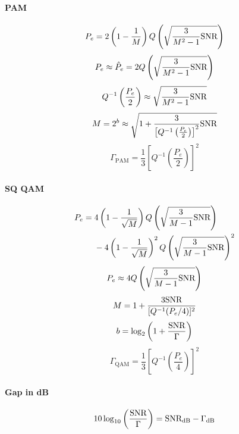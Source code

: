 \paragraph{PAM}
$$P_e = 2 \left(1 - \frac 1 M\right) Q \left( \sqrt{\frac{3}{M^2-1} {\textrm{SNR}}}  \right)$$
\begin{equation}
{P}_e \approx \hat P_e = 2 Q \left( \sqrt{\frac{3}{M^2-1}{\textrm{SNR}}}  \right)
\label{eq:pe_pam_gap}
\end{equation}
$$Q^{-1} \left( \frac {{P}_e}  2 \right) \approx \sqrt{\frac{3}{M^2-1}{\textrm{SNR}}} $$
$$M = 2^{{b}} \approx \sqrt{ 1 + \frac {3} {\left[ Q^{-1} \left( \frac {{P}_e}  2 \right) \right]^2} {\textrm{SNR}}}$$
\begin{equation}
\Gamma_{\textrm{PAM}} = \frac 1 3 \left[ Q^{-1} \left( \frac {{P}_e}  2 \right) \right]^2
\label{eq:gap_pam}
\end{equation}

\paragraph{SQ QAM}
\begin{equation}
\begin{split}
P_e = {} & 4 \left( 1 - \frac 1 {\sqrt{M}} \right) Q \left( \sqrt{\frac{3}{M-1} {\textrm{SNR}}} \right) \\
         & - 4 \left(1 - \frac 1 {\sqrt{M}} \right)^2 Q \left( \sqrt{\frac{3}{M-1} {\textrm{SNR}}} \right)^2
\end{split}
\label{eq:pe_qam}
\end{equation}
\begin{equation}
P_e \approx 4  Q \left( \sqrt{\frac{3}{M-1}{\textrm{SNR}}}  \right)
\label{eq:pe_qam_gap}
\end{equation}
$$
M = 1 + \frac{3 {\textrm{SNR}}}{[Q^{-1}(P_e/4)]^2}
$$
$$
b = \log_2 \left(1 + \frac{{\textrm{SNR}}}{\Gamma} \right)
$$
\begin{equation}
\Gamma_{\textrm{QAM}} = \frac{1}{3} \left[ Q^{-1} \left( \frac {{P}_e}  4 \right) \right]^2
\label{eq:gap_qam}
\end{equation}

\paragraph{Gap in dB}
\[
10 \log_{10} \left( \frac{{\textrm{SNR}}}{\Gamma} \right) = {\textrm{SNR}_{\textrm{dB}}} - \Gamma_{\textrm{dB}}
\]

